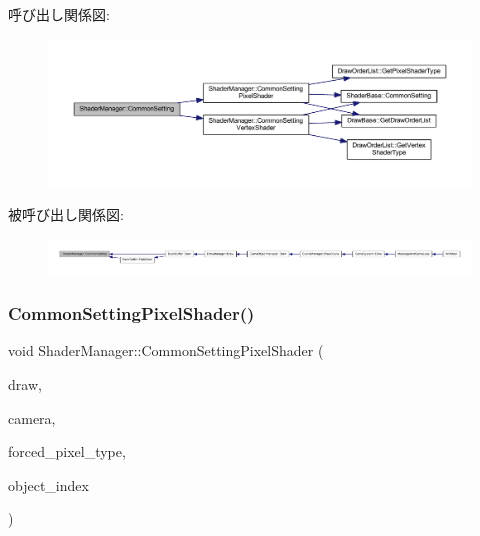 呼び出し関係図\+:\nopagebreak
\begin{figure}[H]
\begin{center}
\leavevmode
\includegraphics[width=350pt]{class_shader_manager_a6cfff8f4aee59d9bc5162a5a6f4d07d4_cgraph}
\end{center}
\end{figure}
被呼び出し関係図\+:
\nopagebreak
\begin{figure}[H]
\begin{center}
\leavevmode
\includegraphics[width=350pt]{class_shader_manager_a6cfff8f4aee59d9bc5162a5a6f4d07d4_icgraph}
\end{center}
\end{figure}
\mbox{\label{class_shader_manager_ad2b591958e1d22d746e5ed3d7941e4c1}} 
\subsubsection{\texorpdfstring{Common\+Setting\+Pixel\+Shader()}{CommonSettingPixelShader()}}
{\footnotesize\ttfamily void Shader\+Manager\+::\+Common\+Setting\+Pixel\+Shader (\begin{DoxyParamCaption}\item[{\mbox{\hyperlink{class_draw_base}{Draw\+Base}} $\ast$}]{draw,  }\item[{\mbox{\hyperlink{class_camera}{Camera}} $\ast$}]{camera,  }\item[{\mbox{\hyperlink{class_shader_manager_a7d15d773b3c6a99dd7086c45c8b0be5f}{Pixel\+Shader\+Type}}}]{forced\+\_\+pixel\+\_\+type,  }\item[{unsigned}]{object\+\_\+index }\end{DoxyParamCaption})\hspace{0.3cm}{\ttfamily [private]}}



